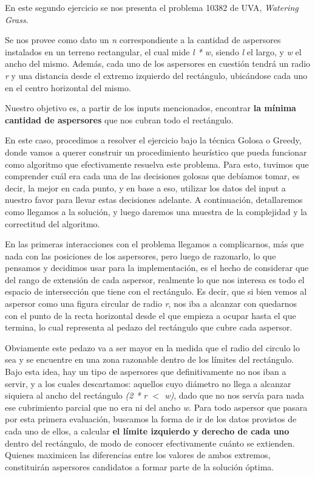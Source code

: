 \documentclass[./main.tex]{subfiles}
\begin{document}
En este segundo ejercicio se nos presenta el problema 10382 de UVA, \textit{Watering Grass}. \newline

Se nos provee como dato un \textit{n} correspondiente a la cantidad de aspersores instalados en un terreno rectangular, el cual mide \textit{l * w}, siendo \textit{l} el largo, y \textit{w} el ancho del mismo.
Además, cada uno de los aspersores en cuestión tendrá un radio \textit{r} y una distancia desde el extremo izquierdo del rectángulo, ubicándose cada uno en el centro horizontal del mismo. \newline

Nuestro objetivo es, a partir de los inputs mencionados, encontrar \textbf{la mínima cantidad de aspersores} que nos cubran todo el rectángulo. \newline

En este caso, procedimos a resolver el ejercicio bajo la técnica Golosa o Greedy, donde vamos a querer construir un procedimiento heurístico que pueda funcionar como algoritmo que efectivamente resuelva este problema. Para esto, tuvimos que comprender cuál era cada una de las decisiones golosas que debíamos tomar, es decir, la mejor en cada punto, y en base a eso, utilizar los datos del input a nuestro favor para llevar estas decisiones adelante. A continuación, detallaremos como llegamos a la solución, y luego daremos una muestra de la complejidad y la correctitud del algoritmo. \newline

En las primeras interacciones con el problema llegamos a complicarnos, más que nada con las posiciones de los aspersores, pero luego de razonarlo, lo que pensamos y decidimos usar para la implementación, es el hecho de considerar que del rango de extensión de cada aspersor, realmente lo que nos interesa es todo el espacio de intersección que tiene con el rectángulo. Es decir, que si bien vemos al aspersor como una figura circular de radio \textit{r}, nos iba a alcanzar con quedarnos con el punto de la recta horizontal desde el que empieza a ocupar hasta el que termina, lo cual representa al pedazo del rectángulo que cubre cada aspersor. \newline

Obviamente este pedazo va a ser mayor en la medida que el radio del circulo lo sea y se encuentre en una zona razonable dentro de los límites del rectángulo. Bajo esta idea, hay un tipo de aspersores que definitivamente no nos iban a servir, y a los cuales descartamos: aquellos cuyo diámetro no llega a alcanzar siquiera al ancho del rectángulo \textit{(2 * r $<$ w)}, dado que no nos servía para nada ese cubrimiento parcial que no era ni del ancho \textit{w}. Para todo aspersor que pasara por esta primera evaluación, buscamos la forma de ir de los datos provistos de cada uno de ellos, a calcular \textbf{el límite izquierdo y derecho de cada uno} dentro del rectángulo, de modo de conocer efectivamente cuánto se extienden. Quienes maximicen las diferencias entre los valores de ambos extremos, constituirán aspersores candidatos a formar parte de la solución óptima.\newline
\end{document}
